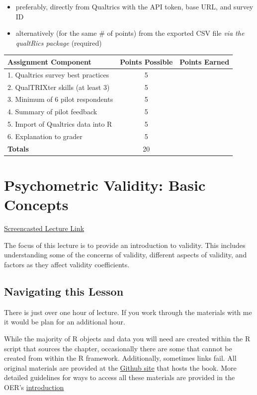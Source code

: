\documentclass[
  english,
]{book}
\providecommand{\tightlist}{%
  \setlength{\itemsep}{0pt}\setlength{\parskip}{0pt}}
\begin{document}
\begin{itemize}
  \begin{itemize}
  \tightlist
  \item
    preferably, directly from Qualtrics with the API token, base URL, and survey ID
  \item
    alternatively (for the same \# of points) from the exported CSV file \emph{via the qualtRics package} (required)
  \end{itemize}
\end{itemize}

\begin{longtable}[]{@{}lcc@{}}
\toprule
Assignment Component & Points Possible & Points Earned \\
\midrule
\endhead
1. Qualtrics survey best practices & 5 & \\
2. QualTRIXter skills (at least 3) & 5 & \\
3. Minimum of 6 pilot respondents & 5 & \\
4. Summary of pilot feedback & 5 & \\
5. Import of Qualtrics data into R & 5 & \\
6. Explanation to grader & 5 & \\
\textbf{Totals} & 20 & \\
\bottomrule
\end{longtable}

\hypertarget{rxy}{%
\chapter{Psychometric Validity: Basic Concepts}\label{rxy}}

\href{https://spu.hosted.panopto.com/Panopto/Pages/Viewer.aspx?pid=d3b821d7-c182-435d-80ba-ad9e003dbc97}{Screencasted Lecture Link}

The focus of this lecture is to provide an introduction to validity. This includes understanding some of the concerns of validity, different aspects of validity, and factors as they affect validity coefficients.

\hypertarget{navigating-this-lesson-2}{%
\section{Navigating this Lesson}\label{navigating-this-lesson-2}}

There is just over one hour of lecture. If you work through the materials with me it would be plan for an additional hour.

While the majority of R objects and data you will need are created within the R script that sources the chapter, occasionally there are some that cannot be created from within the R framework. Additionally, sometimes links fail. All original materials are provided at the \href{https://github.com/lhbikos/ReC_Psychometrics}{Github site} that hosts the book. More detailed guidelines for ways to access all these materials are provided in the OER's \protect\hyperlink{ReCintro}{introduction}
\end{document}
